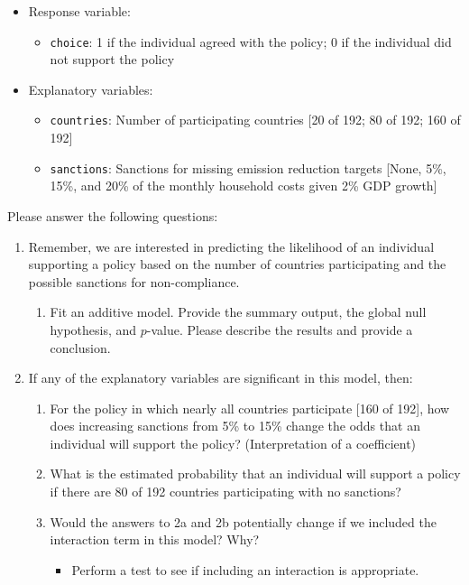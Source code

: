 \documentclass[12pt,letterpaper]{article}
\begin{document}
\begin{itemize}
	\item
	Response variable: 
	\begin{itemize}
		\item \texttt{choice}: 1 if the individual agreed with the policy; 0 if the individual did not support the policy
	\end{itemize}
	\item
	Explanatory variables: 
	\begin{itemize}
		\item
		\texttt{countries}: Number of participating countries [20 of 192; 80 of 192; 160 of 192]
		\item
		\texttt{sanctions}: Sanctions for missing emission reduction targets [None, 5\%, 15\%, and 20\% of the monthly household costs given 2\% GDP growth]
		
	\end{itemize}
	
\end{itemize}

\newpage
\noindent Please answer the following questions:

\begin{enumerate}
	\item
	Remember, we are interested in predicting the likelihood of an individual supporting a policy based on the number of countries participating and the possible sanctions for non-compliance.
	\begin{enumerate}
		\item [] Fit an additive model. Provide the summary output, the global null hypothesis, and $p$-value. Please describe the results and provide a conclusion.
	\end{enumerate}
	
	\item
	If any of the explanatory variables are significant in this model, then:
	\begin{enumerate}
		\item
		For the policy in which nearly all countries participate [160 of 192], how does increasing sanctions from 5\% to 15\% change the odds that an individual will support the policy? (Interpretation of a coefficient)
		\item
		What is the estimated probability that an individual will support a policy if there are 80 of 192 countries participating with no sanctions? 
		\item
		Would the answers to 2a and 2b potentially change if we included the interaction term in this model? Why? 
		\begin{itemize}
			\item Perform a test to see if including an interaction is appropriate.
		\end{itemize}
	\end{enumerate}
	\end{enumerate}
\end{document}
